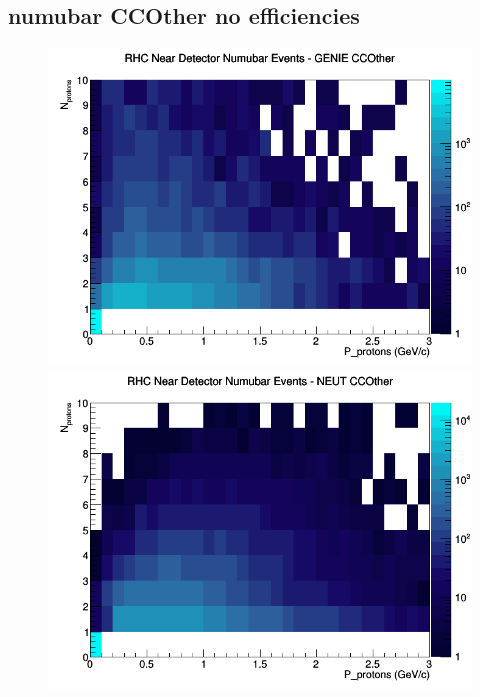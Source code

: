 \documentclass[12pt]{article}
\begin{document}
\subsection{numubar CCOther no efficiencies}
\begin{figure}[h]
\includegraphics[width=\linewidth]{N_P/nominal/protons/CCOther_RHC_ND_numubar_N_P_GENIE.png}
\endminipage
{}
\includegraphics[width=\linewidth]{N_P/nominal/protons/CCOther_RHC_ND_numubar_N_P_NEUT.png}
\endminipage
{}

\end{figure}
\end{document}
